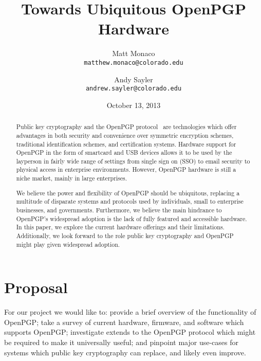 \documentclass[letterpaper,twocolumn,10pt]{article}
\begin{document}
%
%

	\title{\Large \bf
		Towards Ubiquitous OpenPGP Hardware
	}

	\date{October 13, 2013}

	\author{
		Matt Monaco \\
		\texttt{matthew.monaco@colorado.edu}
		\and
		Andy Sayler \\
		\texttt{andrew.sayler@colorado.edu}
	}

	\maketitle

\begin{abstract}

Public key cryptography and the OpenPGP protocol~\cite{rfc4880} are technologies
which offer advantages in both security and convenience over symmetric
encryption schemes, traditional identification schemes, and certification
systems. Hardware support for OpenPGP in the form of smartcard and USB devices
allows it to be used by the layperson in fairly wide range of settings from
single sign on (SSO) to email security to physical access in enterprise
environments. However, OpenPGP hardware is still a niche market, mainly in large
enterprises.

We believe the power and flexibility of OpenPGP should be ubiquitous, replacing
a multitude of disparate systems and protocols used by individuals, small to
enterprise businesses, and governments. Furthermore, we believe the main
hindrance to OpenPGP's widespread adoption is the lack of fully featured and
accessible hardware. In this paper, we explore the current hardware offerings
and their limitations. Additionally, we look forward to the role public key
cryptography and OpenPGP might play given widespread adoption.

\end{abstract}

%
%

\section{Proposal}

For our project we would like to: provide a brief overview of the functionality
of OpenPGP; take a survey of current hardware, firmware, and software which
supports OpenPGP; investigate extends to the OpenPGP protocol which might be
required to make it universally useful; and pinpoint major use-cases for systems
which public key cryptography can replace, and likely even improve.
\end{document}
